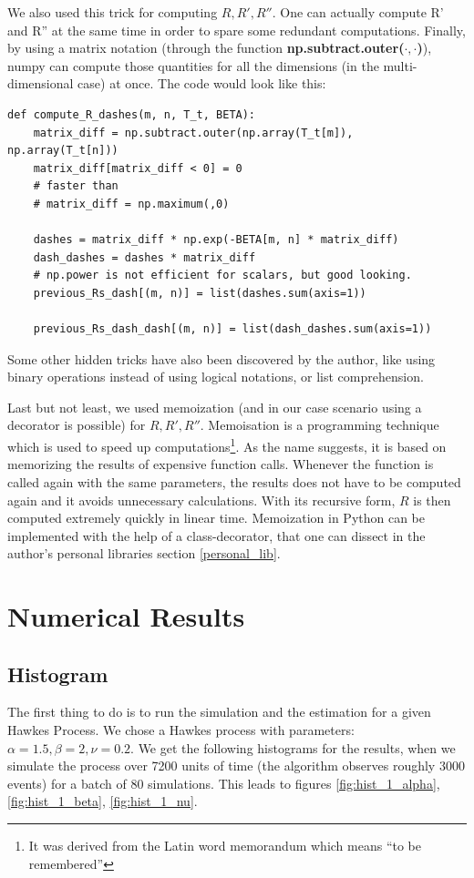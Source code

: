 \documentclass[11pt]{book}
\begin{document}
We also used this trick for computing $R,R',R''$. One can actually compute R' and R'' at the same time in order to spare some redundant computations. Finally, by using a matrix notation (through the function \textbf{np.subtract.outer($\cdot,\cdot$)}), numpy can compute those quantities for all the dimensions (in the multi-dimensional case) at once. The code would look like this:

\begin{verbatim}
def compute_R_dashes(m, n, T_t, BETA):
    matrix_diff = np.subtract.outer(np.array(T_t[m]), np.array(T_t[n]))
    matrix_diff[matrix_diff < 0] = 0
    # faster than
    # matrix_diff = np.maximum(,0)

    dashes = matrix_diff * np.exp(-BETA[m, n] * matrix_diff)
    dash_dashes = dashes * matrix_diff
    # np.power is not efficient for scalars, but good looking.
    previous_Rs_dash[(m, n)] = list(dashes.sum(axis=1))

    previous_Rs_dash_dash[(m, n)] = list(dash_dashes.sum(axis=1))
\end{verbatim}

Some other hidden tricks have also been discovered by the author, like using binary operations instead of using logical notations, or list comprehension.

Last but not least, we used memoization (and in our case scenario using a decorator is possible) for $R,R',R''$. Memoisation is a programming technique which is used to speed up computations\footnote{It was derived from the Latin word memorandum which means “to be remembered”}. As the name suggests, it is based on memorizing the results of expensive function calls. Whenever the function is called again with the same parameters, the results does not have to be computed again and it avoids unnecessary calculations. With its recursive form, $R$ is then computed extremely quickly in linear time. Memoization in Python can be implemented with the help of a class-decorator, that one can dissect in the author's personal libraries section \ref{personal_lib}. 




\section{Numerical Results}



\subsection{Histogram}
The first thing to do is to run the simulation and the estimation for a given Hawkes Process. We chose a Hawkes process with parameters: $\alpha = 1.5, \beta = 2, \nu = 0.2$. We get the following histograms for the results, when we simulate the process over 7200 units of time (the algorithm observes roughly 3000 events) for a batch of 80 simulations. This leads to figures \ref{fig:hist_1_alpha}, \ref{fig:hist_1_beta}, \ref{fig:hist_1_nu}.
\end{document}
